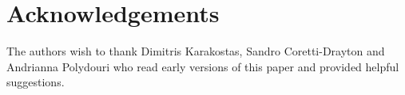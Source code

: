 \ifanonymous\else
\section{Acknowledgements}

The authors wish to thank Dimitris Karakostas, Sandro Coretti-Drayton and
Andrianna Polydouri who read early versions of this paper and provided helpful
suggestions.
\fi
